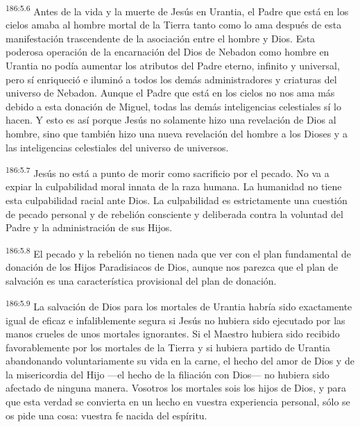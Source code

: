 \par 
\textsuperscript{186:5.6} Antes de la vida y la muerte de Jesús en Urantia, el Padre que está en los cielos amaba al hombre mortal de la Tierra tanto como lo ama después de esta manifestación trascendente de la asociación entre el hombre y Dios. Esta poderosa operación de la encarnación del Dios de Nebadon como hombre en Urantia no podía aumentar los atributos del Padre eterno, infinito y universal, pero sí enriqueció e iluminó a todos los demás administradores y criaturas del universo de Nebadon. Aunque el Padre que está en los cielos no nos ama más debido a esta donación de Miguel, todas las demás inteligencias celestiales sí lo hacen. Y esto es así porque Jesús no solamente hizo una revelación de Dios al hombre, sino que también hizo una nueva revelación del hombre a los Dioses y a las inteligencias celestiales del universo de universos.

\par 
\textsuperscript{186:5.7} Jesús no está a punto de morir como sacrificio por el pecado. No va a expiar la culpabilidad moral innata de la raza humana. La humanidad no tiene esta culpabilidad racial ante Dios. La culpabilidad es estrictamente una cuestión de pecado personal y de rebelión consciente y deliberada contra la voluntad del Padre y la administración de sus Hijos.

\par 
\textsuperscript{186:5.8} El pecado y la rebelión no tienen nada que ver con el plan fundamental de donación de los Hijos Paradisiacos de Dios, aunque nos parezca que el plan de salvación es una característica provisional del plan de donación.

\par 
\textsuperscript{186:5.9} La salvación de Dios para los mortales de Urantia habría sido exactamente igual de eficaz e infaliblemente segura si Jesús no hubiera sido ejecutado por las manos crueles de unos mortales ignorantes. Si el Maestro hubiera sido recibido favorablemente por los mortales de la Tierra y si hubiera partido de Urantia abandonando voluntariamente su vida en la carne, el hecho del amor de Dios y de la misericordia del Hijo ---el hecho de la filiación con Dios--- no hubiera sido afectado de ninguna manera. Vosotros los mortales sois los hijos de Dios, y para que esta verdad se convierta en un hecho en vuestra experiencia personal, sólo se os pide una cosa: vuestra fe nacida del espíritu.
